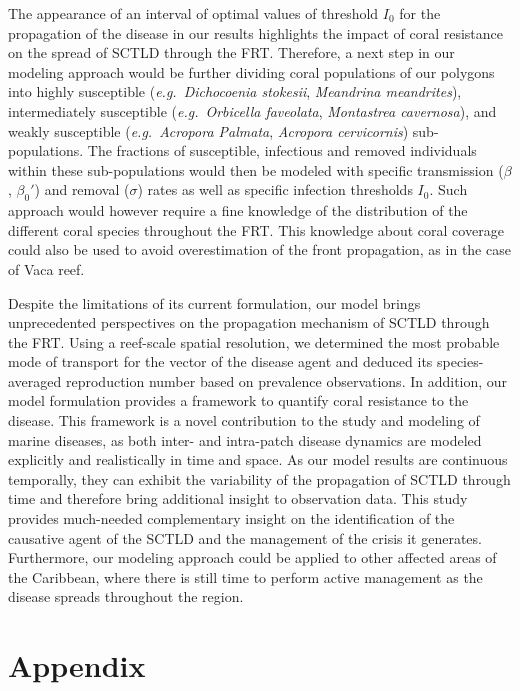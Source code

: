 \documentclass[utf8]{frontiersSCNS}
\newcommand{\eg}{{\it e.g.}\ }
\begin{document}
The appearance of an interval of optimal values of threshold $I_0$ for the propagation of the disease in our results highlights the impact of coral resistance on the spread of SCTLD through the FRT. Therefore, a next step in our modeling approach would be further dividing coral populations of our polygons into highly susceptible (\eg \textit{Dichocoenia stokesii}, \textit{Meandrina meandrites}), intermediately susceptible (\eg \textit{Orbicella faveolata}, \textit{Montastrea cavernosa}), and weakly susceptible (\eg \textit{Acropora Palmata}, \textit{Acropora cervicornis}) sub-populations. The fractions of susceptible, infectious and removed individuals within these sub-populations would then be modeled with specific transmission ($\beta$, $\beta_0'$) and removal ($\sigma$) rates as well as specific infection thresholds $I_0$. Such approach would however require a fine knowledge of the distribution of the different coral species throughout the FRT. This knowledge about coral coverage could also be used to avoid overestimation of the front propagation, as in the case of Vaca reef.

Despite the limitations of its current formulation, our model brings unprecedented perspectives on the propagation mechanism of SCTLD through the FRT. Using a reef-scale spatial resolution, we determined the most probable mode of transport for the vector of the disease agent and deduced its species-averaged reproduction number based on prevalence observations. In addition, our model formulation provides a framework to quantify coral resistance to the disease.  This framework is a novel contribution to the study and modeling of marine diseases, as both inter- and intra-patch disease dynamics are modeled explicitly and realistically in time and space. As our model results are continuous temporally, they can exhibit the variability of the propagation of SCTLD through time and therefore bring additional insight to observation data. This study provides much-needed complementary insight on the identification of the causative agent of the SCTLD and the management of the crisis it generates. Furthermore, our modeling approach could be applied to other affected areas of the Caribbean, where there is still time to perform active management as the disease spreads throughout the region.

\appendix
\section*{Appendix}
% 
\end{document}
